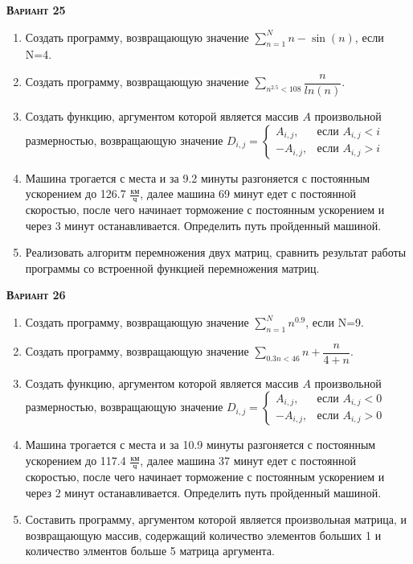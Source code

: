 \textsc{\textbf{Вариант 25}}
\begin{enumerate}
\item  Создать программу, возвращающую значение $\sum\limits_{n=1}^{N} n-\sin(n)                     $, если N=4. 
\item  Создать программу, возвращающую значение $\sum\limits_{n^{2.5}< 108} \dfrac{n}{ln(n)}              $. 
\item Создать функцию, аргументом которой является массив $A$ произвольной размерностью, возвращающую значение $D_{i,j}=\begin{cases} A_{i,j}, & \text{если } {A_{i,j}}<i \\  -A_{i,j}, & \text{если } {A_{i,j}}>i \end{cases}                               $ 
\item Машина трогается с места и за  9.2 минуты разгоняется с постоянным ускорением до 126.7 ${\frac{км}{ч}}$, далее машина   69 минут едет с постоянной скоростью, после чего начинает торможение с постоянным ускорением и через   3 минут останавливается. Определить путь пройденный машиной.  \item Реализовать алгоритм перемножения двух матриц, сравнить результат работы программы со встроенной функцией перемножения матриц.                                                                                                          

\end{enumerate}
\textsc{\textbf{Вариант 26}}
\begin{enumerate}
\item  Создать программу, возвращающую значение $\sum\limits_{n=1}^{N} {n}^{0.9}                     $, если N=9. 
\item  Создать программу, возвращающую значение $\sum\limits_{0.3n<     46} n+\dfrac{n}{4+n}              $. 
\item Создать функцию, аргументом которой является массив $A$ произвольной размерностью, возвращающую значение $D_{i,j}=\begin{cases} A_{i,j}, & \text{если } A_{i,j}<0 \\ -A_{i,j}, & \text{если } A_{i,j}>0 \end{cases}                                    $ 
\item Машина трогается с места и за 10.9 минуты разгоняется с постоянным ускорением до 117.4 ${\frac{км}{ч}}$, далее машина   37 минут едет с постоянной скоростью, после чего начинает торможение с постоянным ускорением и через   2 минут останавливается. Определить путь пройденный машиной.  \item Составить программу, аргументом которой является произвольная матрица, и возвращающую массив, содержащий количество элементов больших 1 и количество элментов больше 5 матрица аргумента.

\end{enumerate}

